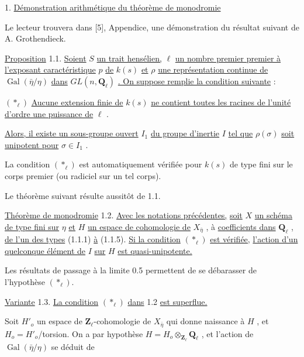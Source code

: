 1.  \underline{Démonstration arithmétique du théorème de monodromie}

Le lecteur trouvera dans  [5], Appendice, une démonstration du résultat suivant de A. Grothendieck.

\underline{Proposition} 1.1.  \underline{Soient}  $S$  \underline{un trait hensélien,}  $\ell$  \underline{un nombre premier premier à l'exposant caractéristique}  $p$  \underline{de}  $k(s)$  \underline{et}  $\rho$  \underline{une représentation continue de}  $\operatorname{Gal}(\bar\eta/\eta)$  \underline{dans}  $GL(n,\mathbf{Q}_\ell)$ \underline{. On suppose remplie la condition suivante} :

$(*_\ell)$      \underline{Aucune extension finie de}  $k(s)$  \underline{ne contient toutes les racines de l'unité d'ordre une puissance de}  $\ell$ .



\underline{Alors, il existe un sous-groupe ouvert}  $I_1$  \underline{du groupe d'inertie}  $I$  \underline{tel que}  $\rho(\sigma)$  \underline{soit unipotent pour}  $\sigma \in I_1$ .

La condition  $(*_\ell)$  est automatiquement vérifiée pour  $k(s)$  de type fini sur le corps premier (ou radiciel sur un tel corps).

Le théorème suivant résulte aussitôt de 1.1.

\underline{Théorème de monodromie} 1.2.  \underline{Avec les notations précédentes,} \underline{soit}  $X$  \underline{un schéma de type fini sur}  $\eta$  \underline{et}  $H$  \underline{un espace de cohomologie de}  $X_{\bar\eta}$ , à \underline{coefficients dans}  $\mathbf{Q}_\ell$ , \underline{de  l'un des types} (1.1.1) \underline{à} (1.1.5). \underline{Si la condition}  $(*_\ell)$  \underline{est vérifiée,} \underline{l'action d'un quelconque élément de}  $I$  \underline{sur}  $H$  \underline{est quasi-unipotente.}

Les résultats de passage à la limite 0.5 permettent de se débarasser de l'hypothèse  $(*_\ell)$.

\underline{Variante} 1.3.  \underline{La condition}  $(*_\ell)$  \underline{dans} 1.2 \underline{est superflue.}

Soit  $H'_o$  un espace de  $\mathbf{Z}_\ell$-cohomologie de  $X_{\bar\eta}$  qui donne naissance à  $H$ , et  $H_o = H'_o$/torsion. On a par hypothèse  $H = H_o \otimes_{\mathbf{Z}_\ell} \mathbf{Q}_\ell$ , et l'action de  $\operatorname{Gal}(\bar\eta/\eta)$  se déduit de

